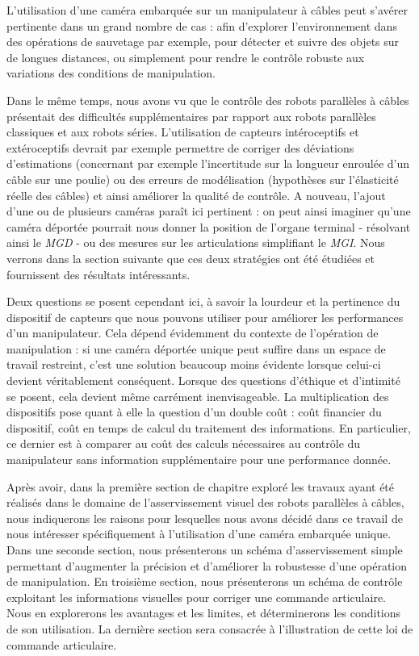 L'utilisation d'une cam\'era embarqu\'ee sur un manipulateur \`a c\^ables peut 
s'av\'erer pertinente dans un grand nombre de cas : afin d'explorer 
l'environnement dans des op\'erations de sauvetage par exemple, pour d\'etecter 
et suivre des objets sur de longues distances, ou simplement pour rendre le 
contr\^ole robuste aux variations des conditions de manipulation.

Dans le m\^eme temps, nous avons vu que le contr\^ole des robots parall\`eles 
\`a c\^ables pr\'esentait des difficult\'es suppl\'ementaires par rapport aux 
robots parall\`eles classiques et aux robots s\'eries. L'utilisation de 
capteurs int\'eroceptifs et ext\'eroceptifs devrait par exemple permettre de 
corriger des d\'eviations d'estimations (concernant par exemple l'incertitude 
sur la longueur enroul\'ee d'un c\^able sur une poulie) ou des erreurs de 
mod\'elisation (hypoth\`eses sur l'\'elasticit\'e r\'eelle des c\^ables) et 
ainsi am\'eliorer la qualit\'e de contr\^ole. A nouveau, l'ajout d'une ou de 
plusieurs cam\'eras para\^it ici pertinent : on peut ainsi imaginer qu'une 
cam\'era d\'eport\'ee pourrait nous donner la position de l'organe terminal - 
r\'esolvant ainsi le {\it MGD} - ou des mesures sur les articulations 
simplifiant le {\it MGI}. Nous verrons dans la section suivante que ces deux 
strat\'egies ont \'et\'e \'etudi\'ees et fournissent des r\'esultats 
int\'eressants.

Deux questions se posent cependant ici, \`a savoir la lourdeur et la pertinence 
du dispositif de capteurs que nous pouvons utiliser pour am\'eliorer les 
performances d'un manipulateur. Cela d\'epend \'evidemment du contexte de 
l'op\'eration de manipulation : si une cam\'era d\'eport\'ee unique peut 
suffire dans un espace de travail restreint, c'est une solution beaucoup moins 
\'evidente lorsque celui-ci devient v\'eritablement cons\'equent. Lorsque des 
questions d'\'ethique et d'intimit\'e se posent, cela devient m\^eme 
carr\'ement inenvisageable. La multiplication des dispositifs pose quant \`a 
elle la question d'un double co\^ut : co\^ut financier du dispositif, co\^ut en 
temps de calcul du traitement des informations. En particulier, ce dernier est 
\`a comparer au co\^ut des calculs n\'ecessaires au contr\^ole du manipulateur 
sans information suppl\'ementaire pour une performance donn\'ee.

Apr\`es avoir, dans la premi\`ere section de chapitre explor\'e les travaux 
ayant \'et\'e r\'ealis\'es dans le domaine de l'asservissement visuel des 
robots parall\`eles \`a c\^ables, nous indiquerons les raisons pour lesquelles 
nous avons d\'ecid\'e dans ce travail de nous int\'eresser sp\'ecifiquement \`a 
l'utilisation d'une cam\'era embarqu\'ee unique. Dans une seconde section, nous 
pr\'esenterons un sch\'ema d'asservissement simple permettant d'augmenter la 
pr\'ecision et d'am\'eliorer la robustesse d'une op\'eration de manipulation. En 
troisi\`eme section, nous pr\'esenterons un sch\'ema de contr\^ole exploitant 
les informations visuelles pour corriger une commande articulaire. Nous en 
explorerons les avantages et les limites, et d\'eterminerons les conditions de 
son utilisation. La derni\`ere section sera consacr\'ee \`a l'illustration de 
cette loi de commande articulaire.

